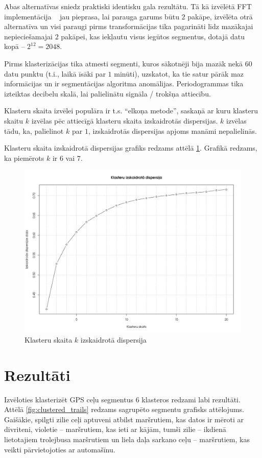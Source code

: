 \documentclass{ludis}
\begin{document}
Abas alternatīvas sniedz praktiski identisku gala rezultātu. Tā kā izvēlētā FFT
implementācija ~\cite{commons_math} jau pieprasa, lai parauga garums būtu $2$ pakāpe, 
izvēlēta otrā alternatīva un visi paraugi pirms transformācijas tika pagarināti līdz mazākajai
nepieciešamajai $2$ pakāpei, kas iekļautu visus iegūtos segmentus, dotajā datu 
kopā -- $2^{12} = 2048$.

Pirms klasterizācijas tika atmesti segmenti, kuros sākotnēji bija mazāk nekā $60$ datu punktu (t.i.,
laikā īsāki par $1$ minūti), uzskatot, ka tie satur pārāk maz informācijas un ir segmentācijas
algoritma anomālijas. Periodogrammas tika izteiktas decibelu skalā, lai palielinātu signāla / 
trokšņa attiecību.

Klasteru skaita izvēlei populāra ir t.s. ``elkoņa metode'', saskaņā ar kuru klasteru skaitu $k$
izvēlas pēc attiecīgā klasteru skaita izskaidrotās dispersijas. $k$ izvēlas tādu, ka, palielinot
$k$ par $1$, izskaidrotās dispersijas apjoms manāmi nepalielinās.

Klasteru skaita izskaidrotā dispersijas grafiks redzams attēlā \ref{fig:kmeans_elbow}. Grafikā 
redzams, ka piemērots $k$ ir $6$ vai $7$.

\begin{figure}
  \centering
  \includegraphics[scale=0.45]{img/kmeans_elbow}
  \caption{Klasteru skaita $k$ izskaidrotā dispersija}
  \label{fig:kmeans_elbow}
\end{figure}

\chapter{Rezultāti}
Izvēloties klasterizēt GPS ceļu segmentus $6$ klasteros redzami labi rezultāti. Attēlā 
\ref{fig:clustered_trails} redzams sagrupēto segmentu grafisks attēlojums. Gaišākie, 
spilgti zilie ceļi aptuveni atbilst maršrutiem, kas datos ir mēroti ar divriteni, violetie -- 
maršrutiem, kas ieti ar kājām, tumši zilie -- ikdienā lietotajiem trolejbusa maršrutiem un liela daļa
sarkano ceļu -- maršrutiem, kas veikti pārvietojoties ar automašīnu.
\end{document}
